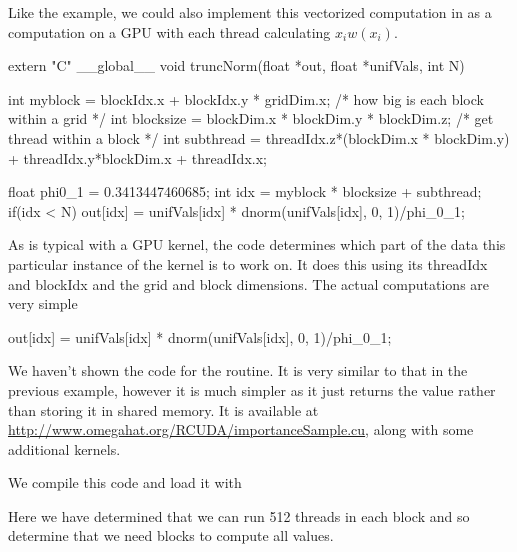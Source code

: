 Like the  example, we could also implement this
vectorized computation in \R{} as a computation on a GPU
with each thread calculating $x_i w(x_i)$.
\begin{CCode}
extern "C"
__global__ void truncNorm(float *out, float *unifVals, int N)
{
    int myblock = blockIdx.x + blockIdx.y * gridDim.x;
           /* how big is each block within a grid */
    int blocksize = blockDim.x * blockDim.y * blockDim.z;
            /* get thread within a block */
    int subthread = threadIdx.z*(blockDim.x * blockDim.y) + 
                     threadIdx.y*blockDim.x + threadIdx.x;

    float phi0_1 = 0.3413447460685;
    int idx = myblock * blocksize + subthread;
    if(idx < N) {
       out[idx] = unifVals[idx] * dnorm(unifVals[idx], 0, 1)/phi_0_1;
    }
}
\end{CCode}
As is typical with a GPU kernel, the code determines
which part of the data this particular instance of the kernel is to
work on. It does this using its threadIdx and blockIdx and 
the grid and block dimensions.
The actual computations are very simple
\begin{CCode}
out[idx] = unifVals[idx] * dnorm(unifVals[idx], 0, 1)/phi_0_1;
\end{CCode}
We haven't shown the code for the  routine. It is very
similar to that in the previous example, however it is much simpler as
it just returns the value rather than storing it in shared memory.
It is available at \url{http://www.omegahat.org/RCUDA/importanceSample.cu},
along with some additional kernels.

We compile this code and load it with
Here we have determined that we can run 512 threads in each block
and so determine that we need  blocks to compute
all   values.

